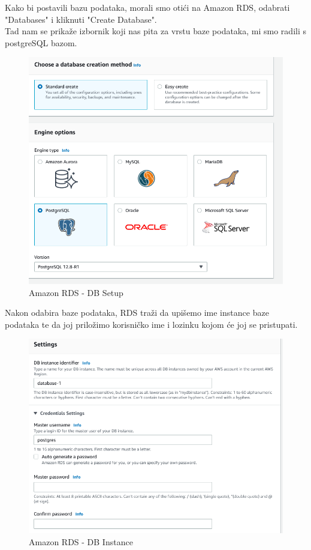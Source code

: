  Kako bi postavili bazu podataka, morali smo otići na Amazon RDS, odabrati "Databases" i kliknuti "Create Database".\\
 Tad nam se prikaže izbornik koji nas pita za vrstu baze podataka, mi smo radili s postgreSQL bazom.
 	 \begin{figure}[H]
 	\centering
 	\includegraphics[scale=0.55]{./slike/rds1.png}
 	\caption{Amazon RDS - DB Setup}
 	\label{fig:rds1}
 \end{figure}\eject

Nakon odabira baze podataka, RDS traži da upišemo ime instance baze\\ podataka te da joj priložimo korisničko ime i lozinku kojom će joj se pristupati.
	 \begin{figure}[H]
	\centering
	\includegraphics[scale=0.55]{./slike/rds2.png}
	\caption{Amazon RDS - DB Instance}
	\label{fig:rds2}
\end{figure}

